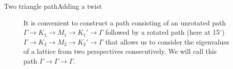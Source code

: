 \documentclass[9pt]{beamer}
\begin{document}
\begin{frame}{Two triangle path}{Adding a twist}
  \begin{figure}
  \centering
    \caption{It is convenient to construct a path consisting of an unrotated path $\Gamma \rightarrow K_1 \rightarrow M_1 \rightarrow K_1' \rightarrow \Gamma$ followed by a rotated path (here at 15$^\circ$)  $\Gamma \rightarrow K_2 \rightarrow M_2 \rightarrow K_2' \rightarrow \Gamma$ that allows us to consider the eigenvalues of a lattice from two perspectives consecutively. We will call this path $\Gamma \rightarrow \Gamma \rightarrow \Gamma$.}
  \end{figure}
\end{frame}
\end{document}
